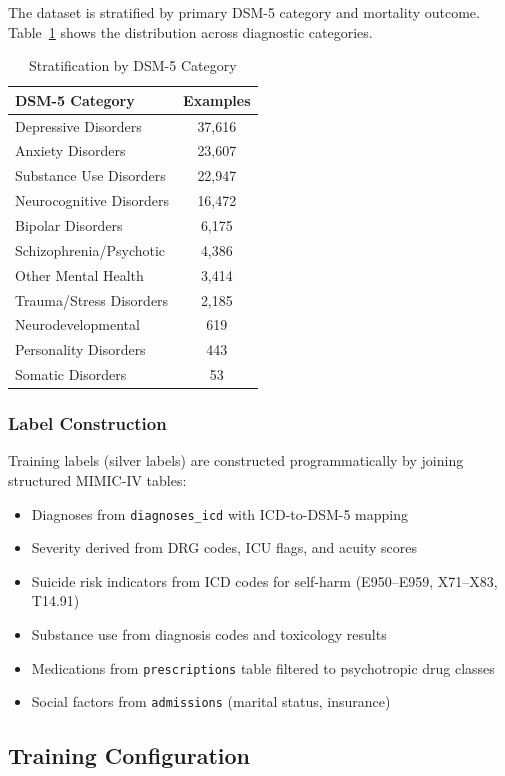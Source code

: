 \documentclass[conference]{IEEEtran}
\begin{document}
The dataset is stratified by primary DSM-5 category and mortality outcome. Table~\ref{tab:stratification} shows the distribution across diagnostic categories.

\begin{table}[t]
\caption{Stratification by DSM-5 Category}
\label{tab:stratification}
\centering
\begin{tabular}{lc}
\hline
\textbf{DSM-5 Category} & \textbf{Examples} \\
\hline
Depressive Disorders & 37,616 \\
Anxiety Disorders & 23,607 \\
Substance Use Disorders & 22,947 \\
Neurocognitive Disorders & 16,472 \\
Bipolar Disorders & 6,175 \\
Schizophrenia/Psychotic & 4,386 \\
Other Mental Health & 3,414 \\
Trauma/Stress Disorders & 2,185 \\
Neurodevelopmental & 619 \\
Personality Disorders & 443 \\
Somatic Disorders & 53 \\
\hline
\end{tabular}
\end{table}

\subsubsection{Label Construction}
Training labels (silver labels) are constructed programmatically by joining structured MIMIC-IV tables:
\begin{itemize}
\item Diagnoses from \texttt{diagnoses\_icd} with ICD-to-DSM-5 mapping
\item Severity derived from DRG codes, ICU flags, and acuity scores
\item Suicide risk indicators from ICD codes for self-harm (E950--E959, X71--X83, T14.91)
\item Substance use from diagnosis codes and toxicology results
\item Medications from \texttt{prescriptions} table filtered to psychotropic drug classes
\item Social factors from \texttt{admissions} (marital status, insurance)
\end{itemize}

\subsection{Training Configuration}
\end{document}
